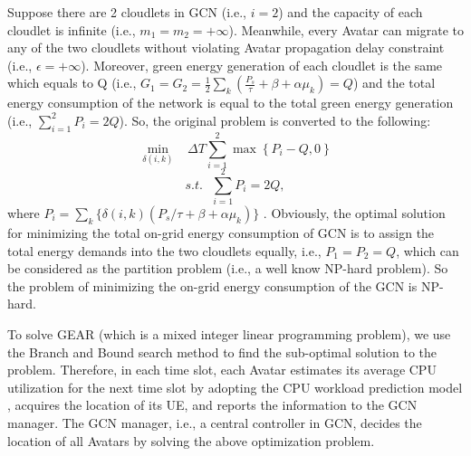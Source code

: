 \documentclass[journal,12pt,draftclsnofoot,onecolumn]{IEEEtran}
\begin{document}
	\begin{IEEEproof}
	Suppose there are 2 cloudlets in GCN (i.e., $i=2$) and the capacity of each cloudlet is infinite (i.e., ${{m}_{1}}={{m}_{2}}=+\infty $). Meanwhile, every Avatar can migrate to any of the two cloudlets without violating Avatar propagation delay constraint (i.e., $\epsilon=+\infty$). Moreover, green energy generation of each cloudlet is the same which equals to Q (i.e., ${{G}_{1}}={{G}_{2}}=\frac{1}{2}\sum\nolimits_{k}{(\frac{{{P}_{s}}}{\tau }+\beta +\alpha {{\mu }_{k}})=Q}$) and the total energy consumption of the network is equal to the total green energy generation (i.e., $\sum\nolimits_{i=1}^{2}{{{P}_{i}}}=2Q$). So, the original problem is converted to the following:
	\begin{equation}
		\underset{\delta \left( i,k \right)}{\mathop{\min }}\,\text{   }\Delta T\sum\limits_{i=1}^{2}{\max \left\{ {{P}_{i}}-Q,0 \right\}}	
	\end{equation}
	\begin{equation}
		s.t.\text{    }\sum\limits_{i=1}^{2}{{{P}_{i}}}=2Q,
	\end{equation}
	where ${{P}_{i}}=\sum\nolimits_{k}{\{\delta (i,k)({{P}_{s}}/\tau +\beta +\alpha {{\mu }_{k}})\}}$ . Obviously, the optimal solution for minimizing the total on-grid energy consumption of GCN is to assign the total energy demands into the two cloudlets equally, i.e., $P_1=P_2=Q$, which can be considered as the partition problem (i.e., a well know NP-hard problem). So the problem of minimizing the on-grid energy consumption of the GCN is NP-hard.\
	\end{IEEEproof}
	
	To solve GEAR (which is a mixed integer linear programming problem), we use the Branch and Bound search method \cite{23} to find the sub-optimal solution to the problem. Therefore, in each time slot, each Avatar estimates its average CPU utilization for the next time slot by adopting the CPU workload prediction model \cite{24}\cite{25}, acquires the location of its UE, and reports the information to the GCN manager. The GCN manager, i.e., a central controller in GCN, decides the location of all Avatars by solving the above optimization problem. 	
\end{document}
